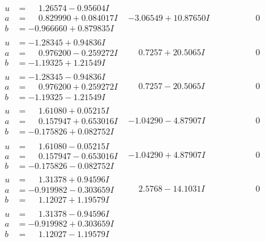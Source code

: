 \documentclass[1p]{elsarticle_modified}
\theoremstyle{definition}
\begin{document}
$$\begin{array}{c|c|c}
\begin{aligned}
u &= \phantom{-}1.26574 - 0.95604 I \\
a &= \phantom{-}0.829990 + 0.084017 I \\
b &= -0.966660 + 0.879835 I\end{aligned}
 & -3.06549 + 10.87650 I & \phantom{-0.000000 } 0 \\ \hline\begin{aligned}
u &= -1.28345 + 0.94836 I \\
a &= \phantom{-}0.976200 - 0.259272 I \\
b &= -1.19325 + 1.21549 I\end{aligned}
 & \phantom{-}0.7257 + 20.5065 I & \phantom{-0.000000 } 0 \\ \hline\begin{aligned}
u &= -1.28345 - 0.94836 I \\
a &= \phantom{-}0.976200 + 0.259272 I \\
b &= -1.19325 - 1.21549 I\end{aligned}
 & \phantom{-}0.7257 - 20.5065 I & \phantom{-0.000000 } 0 \\ \hline\begin{aligned}
u &= \phantom{-}1.61080 + 0.05215 I \\
a &= \phantom{-}0.157947 + 0.653016 I \\
b &= -0.175826 + 0.082752 I\end{aligned}
 & -1.04290 - 4.87907 I & \phantom{-0.000000 } 0 \\ \hline\begin{aligned}
u &= \phantom{-}1.61080 - 0.05215 I \\
a &= \phantom{-}0.157947 - 0.653016 I \\
b &= -0.175826 - 0.082752 I\end{aligned}
 & -1.04290 + 4.87907 I & \phantom{-0.000000 } 0 \\ \hline\begin{aligned}
u &= \phantom{-}1.31378 + 0.94596 I \\
a &= -0.919982 - 0.303659 I \\
b &= \phantom{-}1.12027 + 1.19579 I\end{aligned}
 & \phantom{-}2.5768 - 14.1031 I & \phantom{-0.000000 } 0 \\ \hline\begin{aligned}
u &= \phantom{-}1.31378 - 0.94596 I \\
a &= -0.919982 + 0.303659 I \\
b &= \phantom{-}1.12027 - 1.19579 I\end{aligned}

\end{array}$$
\end{document}
